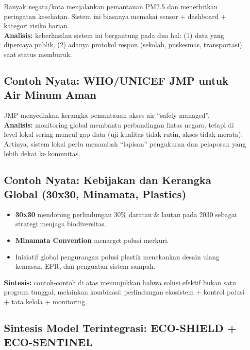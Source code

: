 \documentclass[
  letterpaper,
  DIV=11,
  numbers=noendperiod]{scrreprt}
\providecommand{\tightlist}{%
  \setlength{\itemsep}{0pt}\setlength{\parskip}{0pt}}
\begin{document}
Banyak negara/kota menjalankan pemantauan PM2.5 dan menerbitkan
peringatan kesehatan. Sistem ini biasanya memakai sensor + dashboard +
kategori risiko harian.\\
\textbf{Analisis:} keberhasilan sistem ini bergantung pada dua hal: (1)
data yang dipercaya publik, (2) adanya protokol respon (sekolah,
puskesmas, transportasi) saat status memburuk.

\subsection{Contoh Nyata: WHO/UNICEF JMP untuk Air Minum
Aman}\label{contoh-nyata-whounicef-jmp-untuk-air-minum-aman}

JMP menyediakan kerangka pemantauan akses air ``safely managed''.\\
\textbf{Analisis:} monitoring global membantu perbandingan lintas
negara, tetapi di level lokal sering muncul gap data (uji kualitas tidak
rutin, akses tidak merata). Artinya, sistem lokal perlu menambah
``lapisan'' pengukuran dan pelaporan yang lebih dekat ke komunitas.

\subsection{Contoh Nyata: Kebijakan dan Kerangka Global (30x30,
Minamata,
Plastics)}\label{contoh-nyata-kebijakan-dan-kerangka-global-30x30-minamata-plastics}

\begin{itemize}
\tightlist
\item
  \textbf{30x30} mendorong perlindungan 30\% daratan \& lautan pada 2030
  sebagai strategi menjaga biodiversitas.\\
\item
  \textbf{Minamata Convention} menarget polusi merkuri.\\
\item
  Inisiatif global pengurangan polusi plastik menekankan desain ulang
  kemasan, EPR, dan penguatan sistem sampah.
\end{itemize}

\textbf{Sintesis:} contoh-contoh di atas menunjukkan bahwa solusi
efektif bukan satu program tunggal, melainkan kombinasi: perlindungan
ekosistem + kontrol polusi + tata kelola + monitoring.

\subsection{Sintesis Model Terintegrasi: ECO-SHIELD +
ECO-SENTINEL}\label{sintesis-model-terintegrasi-eco-shield-eco-sentinel}
\end{document}
